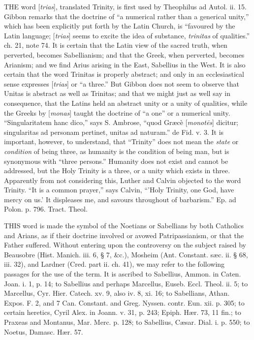 
THE
word [\emph{trias}], translated Trinity, is first used by Theophilus
ad Autol. ii. 15. Gibbon remarks that the doctrine of ``a numerical
rather than a generical unity,'' which has been explicitly put forth by
the Latin Church, is ``favoured by the Latin language; [\emph{trias}]
seems to excite the idea of substance, \emph{trinitas} of qualities.''
ch. 21, note 74. It is certain that the Latin view of the sacred
truth, when perverted, becomes Sabellianism; and that the Greek, when
perverted, becomes Arianism; and we find Arius arising in the East,
Sabellius in the West. It is also certain that the word Trinitas is
properly abstract; and only in an ecclesiastical sense expresses [\emph{trias}]
or ``a three.'' But Gibbon does not seem to observe that Unitas is
abstract as well as Trinitas; and that we might just as well say in
consequence, that the Latins held an abstract unity or a unity of
qualities, while the Greeks by [\emph{monas}] taught the doctrine of ``a
one'' or a numerical unity. ``Singularitatem hanc dico,'' says S.
Ambrose, ``quod Græcè [\emph{monot\={e}s}] dicitur; singularitas
ad personam pertinet, unitas ad naturam.'' de Fid. v. 3. It is
important, however, to understand, that ``Trinity'' does not mean the \emph{state}
or \emph{condition} of being three, as humanity is the condition of
being man, but is synonymous with ``three persons.'' Humanity does
not exist and cannot be addressed, but the Holy Trinity is a three, or
a unity which exists in three. Apparently from not considering this,
Luther and Calvin objected to the word Trinity. ``It is a common
prayer,'' says Calvin, ``'Holy Trinity, one God, have mercy on us.' It
displeases me, and savours throughout of barbarism.'' Ep. ad Polon. p.
796. Tract. Theol.

\xsection{[Huiopator]}

THIS
word is made the symbol of the Noetians or Sabellians by both
Catholics and Arians, as if their doctrine involved or avowed
Patripassianism, or that the Father suffered. Without entering upon
the controversy on the subject raised by Beausobre (Hist. Manich. iii.
6, § 7, \&c.), Mosheim (Ant. Constant. sæc. ii. § 68, iii. 32),
and Lardner (Cred. part ii. ch. 41), we may refer to the following
passages for the use of the term. It is ascribed to Sabellius, Ammon.
in Caten. Joan. i. 1, p. 14; to Sabellius and perhaps Marcellus, Euseb.
Eccl. Theol. ii. 5; to Marcellus, Cyr. Hier. Catech. xv. 9, also iv.
8, xi. 16; to Sabellians, Athan. Expos. F. 2, and 7 Can. Constant. and
Greg. Nyssen. contr. Eun. xii. p. 305; to certain heretics, Cyril
Alex. in Joann. v. 31, p. 243; Epiph. Hær. 73, 11 fin.; to Praxeas
and Montanus, Mar. Merc. p. 128; to Sabellius, Cæsar. Dial. i. p.
550; to Noetus, Damasc. Hær. 57.

